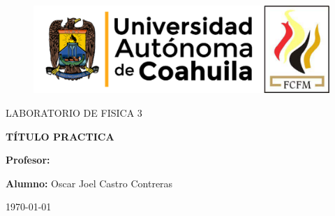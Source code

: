\documentclass[12pt, letterpaper]{article} %
\begin{document}
	

	\begin{titlepage}
		\centering
		{\bfseries
		\begin{figure}[h!]
			\centering
			\includegraphics[width=\linewidth]{Nom_UAdeC_FCFM.png}  						
		\end{figure}
		\par}
		\vspace{2cm}
		{\scshape\LARGE LABORATORIO DE FISICA 3 \par}
		\vspace{3cm}
		{\scshape\Huge \textbf{TÍTULO PRACTICA} \par}
		\vfill
		{\LARGE \textbf{Profesor:} \par}
		\vspace{3cm}
		{\LARGE \textbf{Alumno:} Oscar Joel Castro Contreras \par}
		\vfill
		{\Large \today \par}
		\thispagestyle{empty} %
	\end{titlepage}
     
     \newpage %
     
     \tableofcontents %
	
	\newpage
	
     \begin{abstract}%
     
          Este parrafo se escribe el resumen de nuestro articulo cientifico.
          
     \end{abstract}
	
\end{document}
